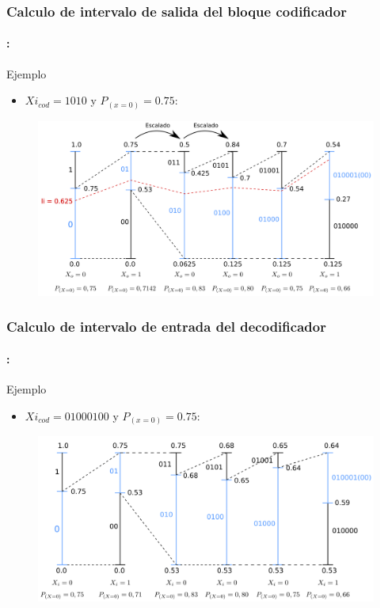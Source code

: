\begin{frame}
  \frametitle{\textbf{Calculo de intervalo de salida del bloque codificador}}
\framesubtitle{\secname : \subsecname}
   \begin{block}{Ejemplo}
   \begin{itemize}
    \item $Xi_{cod} = 1010$ y $P_{(x=0)}=0.75$: 
  \end{itemize}
  \end{block}
      \vspace{-0.3cm}
  \begin{figure}[!t] \centering
  \includegraphics[width=0.85\paperwidth]{Diagramas/int_sal_cod.png}%
  \end{figure}
\end{frame}


\begin{frame}
  \frametitle{\textbf{Calculo de intervalo de entrada del  decodificador}}
\framesubtitle{\secname : \subsecname}
   \begin{block}{Ejemplo}
   \begin{itemize}
    \item $Xi_{cod} = 01000100$ y  $P_{(x=0)}=0.75$:
  \end{itemize}
  \end{block}
      \vspace{-0.3cm}
  \begin{figure}[!t] \centering
  \includegraphics[width=0.85\paperwidth]{Diagramas/int_ent_dec.png}%
  \end{figure}
\end{frame}

